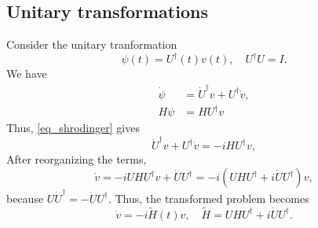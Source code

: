 \documentclass[11pt]{article}
\begin{document}
\subsection{Unitary transformations}
Consider the unitary tranformation
\[
\psi(t) = U^{\dag}(t)v(t),\quad U^\dag U = I.
\]
We have
\begin{align*}
\dot{\psi} &= \dot{U}^\dag v + U^\dag \dot{v},\\
H\psi &= H U^\dag v
\end{align*}
Thus, \eqref{eq_shrodinger} gives
\[
\dot{U}^\dag v + U^\dag \dot{v} = -i H U^\dag v,
\]
After reorganizing the terms,
\[
\dot{v} = -i U H U^\dag v + \dot{U} U^\dag = -i\left( UHU^\dag + i \dot{U} U^\dag \right) v,
\]
because $U \dot{U}^\dag = - \dot{U} U^\dag$. Thus, the transformed problem becomes
\[
\dot{v} = -i \tilde{H}(t) v,\quad \tilde{H} = UHU^\dag + i \dot{U} U^\dag.
\]

\end{document}
